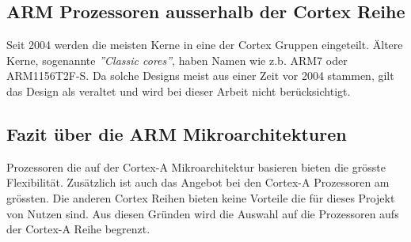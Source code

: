 \subsection{ARM Prozessoren ausserhalb der Cortex Reihe}
Seit 2004 werden die meisten Kerne in eine der Cortex Gruppen eingeteilt.
Ältere Kerne, sogenannte \textit{''Classic cores''}, haben Namen wie z.b. ARM7 oder ARM1156T2F-S.
Da solche Designs meist aus einer Zeit vor 2004 stammen, gilt das Design als veraltet und wird bei dieser Arbeit nicht berücksichtigt.

\subsection{Fazit über die ARM Mikroarchitekturen}
Prozessoren die auf der Cortex-A Mikroarchitektur basieren bieten die grösste Flexibilität.
Zusätzlich ist auch das Angebot bei den Cortex-A Prozessoren am grössten.
Die anderen Cortex Reihen bieten keine Vorteile die für dieses Projekt von Nutzen sind.
Aus diesen Gründen wird die Auswahl auf die Prozessoren aufs der Cortex-A Reihe begrenzt.

